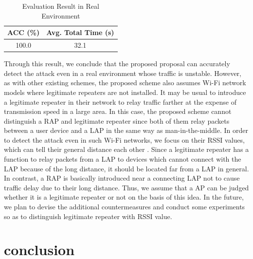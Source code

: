 \documentclass[conference]{IEEEtran}
\begin{document}
\begin{table}[t] 
    \begin{center}
        \caption{Evaluation Result in Real Environment}
        \begin{tabular}{c c} \hline
            ACC (\%) & Avg. Total Time (s) \\ \hline \hline
            100.0 & 32.1 \\ \hline
        \end{tabular}
    \end{center}
\end{table}

Through this result, we conclude that the proposed proposal can accurately detect the attack even in a real environment whose traffic is unstable.
However, as with other existing schemes, the proposed scheme also assumes Wi-Fi network models where legitimate repeaters are not installed.
It may be usual to introduce a legitimate repeater in their network to relay traffic farther at the expense of transmission speed in a large area.
In this case, the proposed scheme cannot distinguish a RAP and legitimate repeater since both of them relay packets between a user device and a LAP in the same way as man-in-the-middle.
In order to detect the attack even in such Wi-Fi networks, we focus on their RSSI values, which can tell their general distance each other \cite{rssi}.
Since a legitimate repeater has a function to relay packets from a LAP to devices which cannot connect with the LAP because of the long distance, it should be located far from a LAP in general.
In contrast, a RAP is basically introduced near a connecting LAP not to cause traffic delay due to their long distance.
Thus, we assume that a AP can be judged whether it is a legitimate repeater or not on the basis of this idea.
In the future, we plan to devise the additional countermeasures and conduct some experiments so as to distinguish legitimate repeater with RSSI value.

\section{conclusion}\label{sec:6}




\vspace{12pt}
\end{document}
